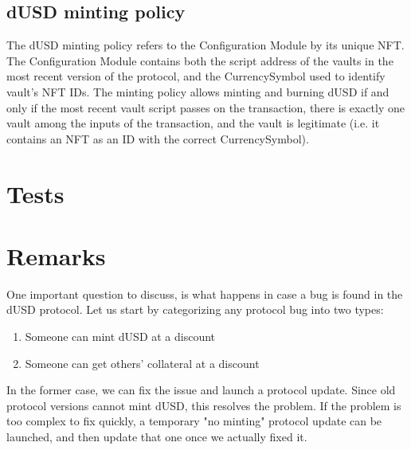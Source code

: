 \documentclass{article} %
\begin{document}
\subsection{dUSD minting policy}

The dUSD minting policy refers to the Configuration Module by its unique NFT.
The Configuration Module contains both the script address of the vaults in the
most recent version of the protocol, and the CurrencySymbol used to identify
vault's NFT IDs. The minting policy allows minting and burning dUSD if and only
if the most recent vault script passes on the transaction, there is exactly one
vault among the inputs of the transaction, and the vault is legitimate (i.e. it
contains an NFT as an ID with the correct CurrencySymbol).

\section{Tests}


% 

\section{Remarks}

One important question to discuss, is what happens in case a bug is found in the
dUSD protocol.
Let us start by categorizing any protocol bug into two types:
\begin{enumerate}
  \item Someone can mint dUSD at a discount
  \item Someone can get others' collateral at a discount
\end{enumerate}

In the former case, we can fix the issue and launch a protocol update. Since old
protocol versions cannot mint dUSD, this resolves the problem.
If the problem is too complex to fix quickly, a temporary "no minting" protocol
update can be launched, and then update that one once we actually fixed it. \\
\end{document}
